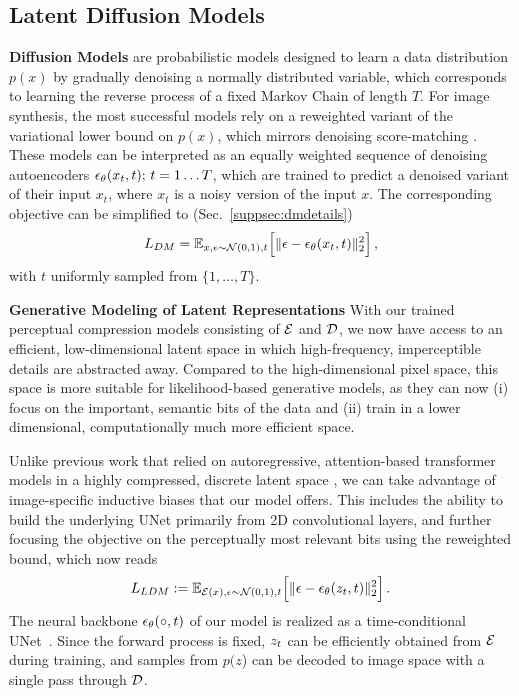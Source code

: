 \documentclass[10pt,twocolumn,letterpaper]{article}
\begin{document}
\subsection{Latent Diffusion Models}
\label{subsec:stagetwo}
%
%
\noindent \textbf{Diffusion Models} \cite{DBLP:journals/corr/Sohl-DicksteinW15} are probabilistic models designed to learn a data distribution $p(x)$ by 
gradually denoising a normally distributed variable, which corresponds to learning
the reverse process of a fixed Markov Chain of length $T$. 
For image synthesis, the most successful models \cite{DBLP:conf/nips/HoJA20, DBLP:journals/corr/abs-2105-05233, DBLP:journals/corr/abs-2104-07636}
rely on a reweighted variant of the variational lower bound on $p(x)$, which mirrors denoising score-matching \cite{DBLP:journals/corr/abs-2011-13456}.
These models can be interpreted as an equally weighted sequence of denoising autoencoders $\epsilon_\theta(x_{t},t);\, t=1\dots T$, 
which are trained to predict a denoised variant of their input $x_t$, where $x_t$ is a noisy version of the input $x$.
The corresponding objective can be simplified to (Sec.~\ref{suppsec:dmdetails})
\begin{equation}
L_{DM} = \mathbb{E}_{x, \epsilon \sim \mathcal{N}(0, 1),  t }\Big[ \Vert \epsilon - \epsilon_\theta(x_{t},t) \Vert_{2}^{2}\Big] \, ,
\label{eq:dmloss}
\end{equation}
with $t$ uniformly sampled from $\{1, \dots, T\}$.


\noindent \textbf{Generative Modeling of Latent Representations}
With our trained perceptual compression models consisting of $\mathcal{E}$ and $\mathcal{D}$, 
we now have access to an efficient, low-dimensional latent space in which high-frequency, imperceptible details are 
abstracted away.
%
%
Compared to the high-dimensional pixel space, this space is more suitable 
for likelihood-based generative models, as they can now (i) focus on the important, semantic bits of the data
and (ii) train in a lower dimensional, computationally much more efficient space.
%
%
%

Unlike previous work that relied on autoregressive, attention-based 
transformer models in a highly compressed, discrete latent space \cite{DBLP:journals/corr/abs-2102-12092, DBLP:journals/corr/abs-2012-09841, yu2021vectorquantized}, 
we can take advantage of image-specific inductive biases that our model offers. 
This includes the ability to build the underlying UNet primarily from 2D convolutional layers, 
%
and further focusing the objective on the perceptually most relevant bits using
the reweighted bound, which now reads
%
%
%
%
%
%
\crossattnfig
%
\begin{equation}
L_{LDM} := \mathbb{E}_{\mathcal{E}(x), \epsilon \sim \mathcal{N}(0, 1),  t}\Big[ \Vert \epsilon - \epsilon_\theta(z_{t},t) \Vert_{2}^{2}\Big] \, .
\label{eq:ldmloss}
\end{equation}
%
The neural backbone $\epsilon_\theta(\circ, t)$ of our model 
is realized as a time-conditional UNet~\cite{DBLP:conf/miccai/RonnebergerFB15}. 
Since the forward process is fixed, $z_{t}$ can be efficiently obtained from
$\mathcal{E}$ during training, 
and samples from $p(z$) can be decoded to image space with a single pass through $\mathcal{D}$.
%
%
\end{document}
